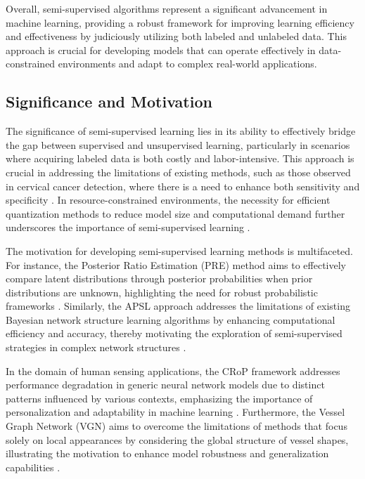 Overall, semi-supervised algorithms represent a significant advancement in machine learning, providing a robust framework for improving learning efficiency and effectiveness by judiciously utilizing both labeled and unlabeled data. This approach is crucial for developing models that can operate effectively in data-constrained environments and adapt to complex real-world applications.



\subsection{Significance and Motivation} \label{subsec:Significance and Motivation}

The significance of semi-supervised learning lies in its ability to effectively bridge the gap between supervised and unsupervised learning, particularly in scenarios where acquiring labeled data is both costly and labor-intensive. This approach is crucial in addressing the limitations of existing methods, such as those observed in cervical cancer detection, where there is a need to enhance both sensitivity and specificity \cite{tumer1999ensemblesradialbasisfunction}. In resource-constrained environments, the necessity for efficient quantization methods to reduce model size and computational demand further underscores the importance of semi-supervised learning \cite{yin2017quantizationtraininglowbitwidth}.



The motivation for developing semi-supervised learning methods is multifaceted. For instance, the Posterior Ratio Estimation (PRE) method aims to effectively compare latent distributions through posterior probabilities when prior distributions are unknown, highlighting the need for robust probabilistic frameworks \cite{liu2020posteriorratioestimationlatent}. Similarly, the APSL approach addresses the limitations of existing Bayesian network structure learning algorithms by enhancing computational efficiency and accuracy, thereby motivating the exploration of semi-supervised strategies in complex network structures \cite{ling2021bayesiannetworkstructurelearning}.



In the domain of human sensing applications, the CRoP framework addresses performance degradation in generic neural network models due to distinct patterns influenced by various contexts, emphasizing the importance of personalization and adaptability in machine learning \cite{kaur2024cropcontextwiserobuststatic}. Furthermore, the Vessel Graph Network (VGN) aims to overcome the limitations of methods that focus solely on local appearances by considering the global structure of vessel shapes, illustrating the motivation to enhance model robustness and generalization capabilities \cite{shin2018deepvesselsegmentationlearning}.



